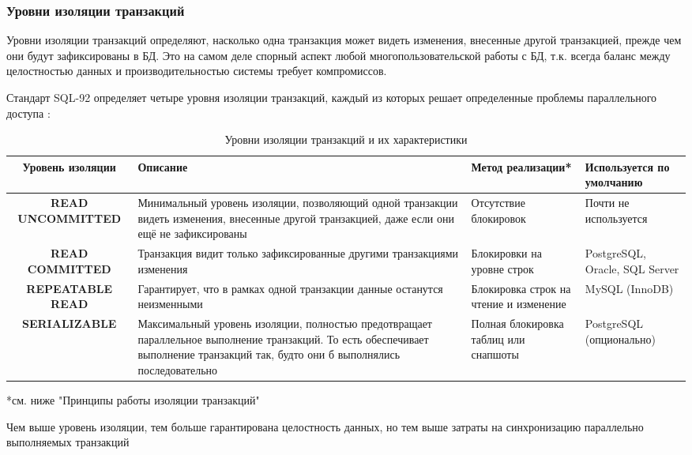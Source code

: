 \subsubsection{Уровни изоляции транзакций}

Уровни изоляции транзакций определяют, насколько одна транзакция может видеть изменения, внесенные другой транзакцией, прежде чем они будут зафиксированы в БД. Это на самом деле спорный аспект любой многопользовательской работы с БД, т.к. всегда баланс между целостностью данных и производительностью системы требует компромиссов.

Стандарт SQL-92 определяет четыре уровня изоляции транзакций, каждый из которых решает определенные проблемы параллельного доступа \autocite{ElmasriNavathe, Silberschatz}:

\begin{table}[H]
    \centering
    \begin{tabular}{|c|p{4.25cm}|p{3.25cm}|p{3cm}|}
        \hline
        \textbf{Уровень изоляции} & \textbf{Описание} & \textbf{Метод реализации*} & \textbf{Используется по умолчанию} \\
        \hline
        \textbf{READ UNCOMMITTED} & Минимальный уровень изоляции, позволяющий одной транзакции видеть изменения, внесенные другой транзакцией, даже если они ещё не зафиксированы & Отсутствие блокировок & Почти не используется \\
        \hline
        \textbf{READ COMMITTED} & Транзакция видит только зафиксированные другими транзакциями изменения & Блокировки на уровне строк & PostgreSQL, Oracle, SQL Server \\
        \hline
        \textbf{REPEATABLE READ} & Гарантирует, что в рамках одной транзакции данные останутся неизменными & Блокировка строк на чтение и изменение & MySQL (InnoDB) \\
        \hline
        \textbf{SERIALIZABLE} & Максимальный уровень изоляции, полностью предотвращает параллельное выполнение транзакций. То есть обеспечивает выполнение транзакций так, будто они б выполнялись последовательно & Полная блокировка таблиц или снапшоты & PostgreSQL (опционально) \\
        \hline
    \end{tabular}
    \caption{Уровни изоляции транзакций и их характеристики}
    \label{tab:isolation_levels}
\end{table}
 *см. ниже "Принципы работы изоляции транзакций"

 Чем выше уровень изоляции, тем больше гарантирована целостность данных, но тем выше затраты на синхронизацию параллельно выполняемых транзакций

